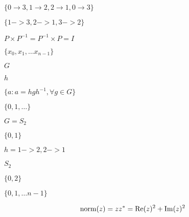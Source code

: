 \documentclass{article}
\begin{document}
$ \{0 \to 3, 1 \to 2, 2 \to 1, 0 \to 3 \} $
\pagebreak

$ \{1->3, 2->1, 3->2\} $
\pagebreak

$ P \times P^{-1} = P^{-1} \times P = I $
\pagebreak

$ \{x_0, x_1, \dots x_{n-1}\} $
\pagebreak

$ G $
\pagebreak

$ h $
\pagebreak

$ \{ a: a = h g h^{-1}, \forall g \in G \} $
\pagebreak

$ \{ 0, 1, \dots \} $
\pagebreak

$ G = S_2 $
\pagebreak

$ \{0,1\} $
\pagebreak

$ h = {1->2, 2->1} $
\pagebreak

$ S_2 $
\pagebreak

$ \{0,2\} $
\pagebreak

$ \{0, 1, \dots n-1\} $
\pagebreak

\[ {\rm norm}(z) = zz^* = {\rm Re}(z)^2 + {\rm Im}(z)^2 \]
\pagebreak
\end{document}
